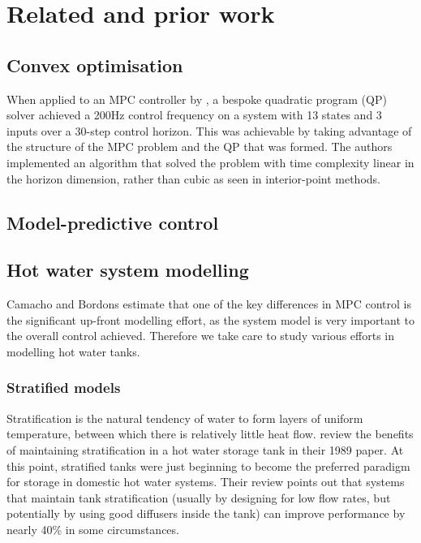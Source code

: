 \chapter{Related and prior work}

\section{Convex optimisation}


When applied to an MPC controller by \textcite{Wang10}, a bespoke quadratic program (QP) solver achieved a 200Hz control frequency on a system with 13 states and 3 inputs over a 30-step control horizon.
This was achievable by taking advantage of the structure of the MPC problem and the QP that was formed.
The authors implemented an algorithm that solved the problem with time complexity linear in the horizon dimension, rather than cubic as seen in interior-point methods.

\section{Model-predictive control}


\section{Hot water system modelling}

Camacho and Bordons estimate that one of the key differences in MPC control is the significant up-front modelling effort, as the system model is very important to the overall control achieved.
Therefore we take care to study various efforts in modelling hot water tanks.

\subsection{Stratified models}

Stratification is the natural tendency of water to form layers of uniform temperature, between which there is relatively little heat flow.
\textcite{Hollands89} review the benefits of maintaining stratification in a
hot water storage tank in their 1989 paper.
At this point, stratified tanks were just beginning to become the preferred paradigm for storage in domestic hot water systems.
Their review points out that systems that maintain tank stratification (usually by designing for low flow rates, but potentially by using good diffusers inside the tank) can improve performance by nearly 40\% in some circumstances.

